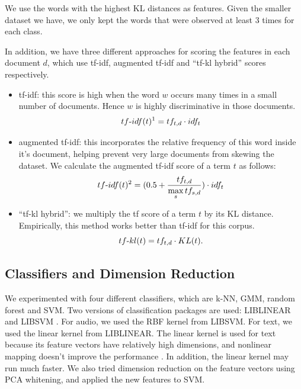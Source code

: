 \documentclass[a4paper]{article}
\begin{document}
We use the words with the highest KL distances as features. Given the smaller dataset we have, we only kept the words that were observed at least 3 times for each class.

In addition, we have three different approaches for scoring the features in each document $d$, which use tf-idf, augmented tf-idf and ``tf-kl hybrid'' scores respectively.
\begin{itemize}
\item tf-idf: this score is high when the word $w$ occurs many times in a small number of documents. Hence $w$ is highly discriminative in those documents.
\begin{equation}
  tf\textnormal{-} idf(t)^1 =tf_{t,d} \cdot idf_{t} 
\label{tfidf1}
\end{equation}

\item augmented tf-idf:  this incorporates the relative frequency of this word inside it's document, helping prevent very large documents from skewing the dataset. We calculate the augmented tf-idf score of a term $t$ as follows:
\begin{equation}
  tf\textnormal{-} idf(t)^2 = (0.5 + \frac{tf_{t,d}}{\underset{s}{\max}\, tf_{s,d}}) \cdot idf_{t} 
\label{tfidf}
\end{equation}

\item ``tf-kl hybrid'': we multiply the tf score of a term $t$ by its KL distance. Empirically, this method works better than tf-idf for this corpus.
\begin{equation}
  tf\textnormal{-} kl(t) = tf_{t,d} \cdot KL(t).
\label{tfkl}
\end{equation}
\end{itemize}


\subsection{Classifiers and Dimension Reduction}
We experimented with four different classifiers, which are k-NN, GMM, random forest and SVM. Two versions of classification packages are used: LIBLINEAR \cite{liblin} and LIBSVM \cite{libsvm}. For audio, we used the RBF kernel from LIBSVM. For text, we used the linear kernel from LIBLINEAR. The linear kernel is used for text because its feature vectors have relatively high dimensions, and nonlinear mapping doesn't improve the performance \cite{svmguide}. In addition, the linear kernel may run much faster. We also tried dimension reduction on the feature vectors using PCA whitening, and applied the new features to SVM.
\end{document}
